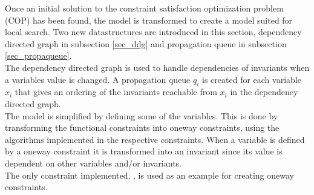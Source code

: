Once an initial solution to the constraint satisfaction optimization problem (COP) has been found, the model 
is transformed to create a model suited for local search. Two new datastructures are introduced 
in this section, dependency directed graph in subsection \ref{sec_ddg} and propagation queue in subsection 
\ref{sec_propaqueue}. 
\\
The dependency directed graph is used to handle dependencies of invariants when a 
variables value is changed. A propagation queue $q_i$ is created for each variable $x_i$ that gives an ordering 
of the 
invariants reachable from  $x_i$ in the dependency directed graph. \\
The model is simplified by defining some of the variables. This is done by transforming the functional constraints into 
oneway constraints, using the algorithms implemented in the respective constraints. When a variable is defined by a 
oneway constraint it is transformed into an invariant since its value is dependent on other variables and/or invariants. 
\\ 
The only constraint implemented, , is used as an example for creating oneway constraints. 
 